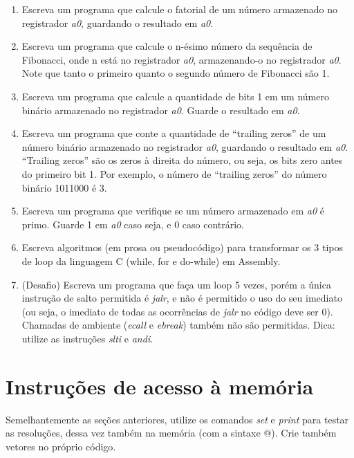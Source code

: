 \documentclass{article}
\begin{document}
\begin{enumerate}
  \item Escreva um programa que calcule o fatorial de um número armazenado no
  registrador \textit{a0}, guardando o resultado em \textit{a0}.

  \item Escreva um programa que calcule o n-ésimo número da sequência de
  Fibonacci, onde n está no registrador \textit{a0}, armazenando-o no
  registrador \textit{a0}. Note que tanto o primeiro quanto o segundo número de
  Fibonacci são 1.

  \item Escreva um programa que calcule a quantidade de bits 1 em um número
  binário armazenado no registrador \textit{a0}. Guarde o resultado em
  \textit{a0}.

  \item Escreva um programa que conte a quantidade de ``trailing zeros'' de um
  número binário armazenado no registrador \textit{a0}, guardando o resultado em
  \textit{a0}. ``Trailing zeros'' são os zeros à direita do número, ou seja, os
  bits zero antes do primeiro bit 1. Por exemplo, o número de ``trailing zeros''
  do número binário 1011000 é 3.

  \item Escreva um programa que verifique se um número armazenado em \textit{a0}
  é primo. Guarde 1 em \textit{a0} caso seja, e 0 caso contrário.

  \item Escreva algoritmos (em prosa ou pseudocódigo) para transformar os 3
  tipos de loop da linguagem C (while, for e do-while) em Assembly.

  \item (Desafio) Escreva um programa que faça um loop 5 vezes, porém a única
  instrução de salto permitida é \textit{jalr}, e não é permitido o uso do seu
  imediato (ou seja, o imediato de todas as ocorrências de \textit{jalr} no
  código deve ser 0). Chamadas de ambiente (\textit{ecall} e \textit{ebreak})
  também não são permitidas. Dica: utilize as instruções \textit{slti} e
  \textit{andi}.
\end{enumerate}

\section{Instruções de acesso à memória}

Semelhantemente as seções anteriores, utilize os comandos \textit{set} e
\textit{print} para testar as resoluções, dessa vez também na memória (com a
sintaxe @). Crie também vetores no próprio código.
\end{document}
